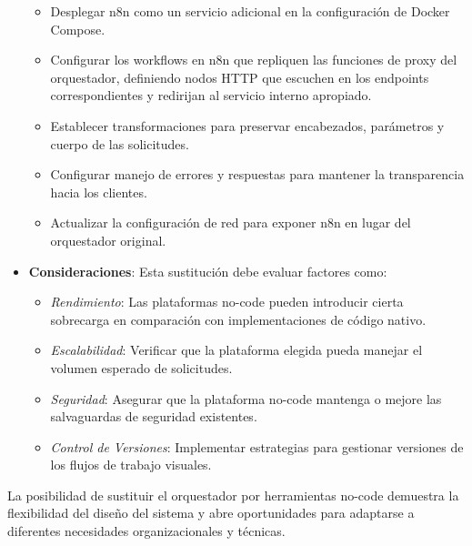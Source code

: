 \documentclass[12pt,a4paper]{article}
\begin{document}
\begin{itemize}
    \begin{itemize}
        \item Desplegar n8n como un servicio adicional en la configuración de Docker Compose.
        
        \item Configurar los workflows en n8n que repliquen las funciones de proxy del orquestador, definiendo nodos HTTP que escuchen en los endpoints correspondientes y redirijan al servicio interno apropiado.
        
        \item Establecer transformaciones para preservar encabezados, parámetros y cuerpo de las solicitudes.
        
        \item Configurar manejo de errores y respuestas para mantener la transparencia hacia los clientes.
        
        \item Actualizar la configuración de red para exponer n8n en lugar del orquestador original.
    \end{itemize}
    
    \item \textbf{Consideraciones}: Esta sustitución debe evaluar factores como:
    
    \begin{itemize}
        \item \textit{Rendimiento}: Las plataformas no-code pueden introducir cierta sobrecarga en comparación con implementaciones de código nativo.
        
        \item \textit{Escalabilidad}: Verificar que la plataforma elegida pueda manejar el volumen esperado de solicitudes.
        
        \item \textit{Seguridad}: Asegurar que la plataforma no-code mantenga o mejore las salvaguardas de seguridad existentes.
        
        \item \textit{Control de Versiones}: Implementar estrategias para gestionar versiones de los flujos de trabajo visuales.
    \end{itemize}
\end{itemize}

La posibilidad de sustituir el orquestador por herramientas no-code demuestra la flexibilidad del diseño del sistema y abre oportunidades para adaptarse a diferentes necesidades organizacionales y técnicas.
\end{document}
